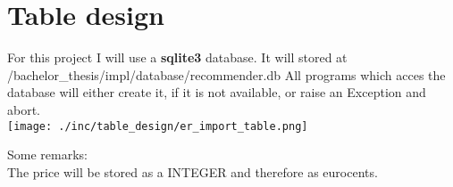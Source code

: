

\section{Table design}
For this project I will use a \textbf{sqlite3} database.
It will stored at /bachelor\_thesis/impl/database/recommender.db
All programs which acces the database will either create it, if it is not available, or raise an Exception and abort.\\

\bigskip
\texttt{[image: ./inc/table\_design/er\_import\_table.png]}

\bigskip
{}

\bigskip
Some remarks:\\
The price will be stored as a INTEGER and therefore as eurocents.\\



